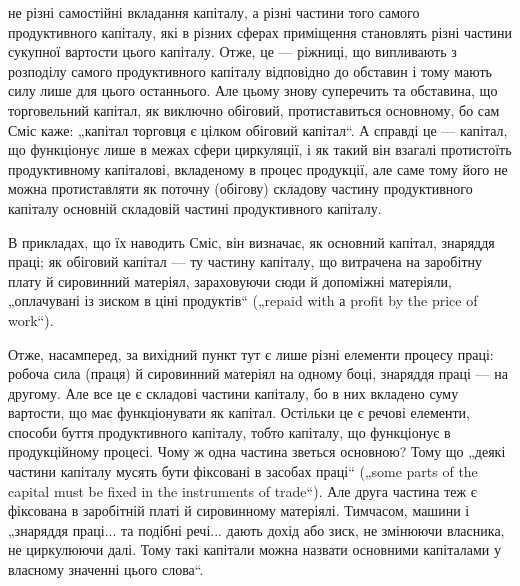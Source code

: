 \parcont{}  %
не різні самостійні вкладання капіталу, а різні частини того самого продуктивного
капіталу, які в різних сферах приміщення становлять різні
частини сукупної вартости цього капіталу. Отже, це — ріжниці, що випливають
з розподілу самого продуктивного капіталу відповідно до
обставин і тому мають силу лише для цього останнього. Але цьому знову
суперечить та обставина, що торговельний капітал, як виключно обіговий,
протиставиться основному, бо сам Сміс каже: „капітал торговця є
цілком обіговий капітал“. А справді це — капітал, що функціонує лише
в межах сфери циркуляції, і як такий він взагалі протистоїть продуктивному
капіталові, вкладеному в процес продукції, але саме тому його не
можна протиставляти як поточну (обігову) складову частину продуктивного
капіталу основній складовій частині продуктивного капіталу.

В прикладах, що їх наводить Сміс, він визначає, як основний капітал,
знаряддя праці; як обіговий капітал — ту частину капіталу, що витрачена
на заробітну плату й сировинний матеріял, зараховуючи сюди й допоміжні
матеріяли, „оплачувані із зиском в ціні продуктів“ („repaid with а
profit by the price of work“).

Отже, насамперед, за вихідний пункт тут є лише різні елементи процесу
праці: робоча сила (праця) й сировинний матеріял на одному боці,
знаряддя праці — на другому. Але все це є складові частини капіталу, бо
в них вкладено суму вартости, що має функціонувати як капітал. Остільки
це є речові елементи, способи буття продуктивного капіталу, тобто
капіталу, що функціонує в продукційному процесі. Чому ж одна частина
зветься основною? Тому що „деякі частини капіталу мусять бути фіксовані
в засобах праці“ („some parts of the capital must be fixed in the
instruments of trade“). Але друга частина теж є фіксована в заробітній
платі й сировинному матеріялі. Тимчасом, машини і „знаряддя праці... та
подібні речі... дають дохід або зиск, не змінюючи власника, не циркулюючи
далі. Тому такі капітали можна назвати основними капіталами у
власному значенні цього слова“.

